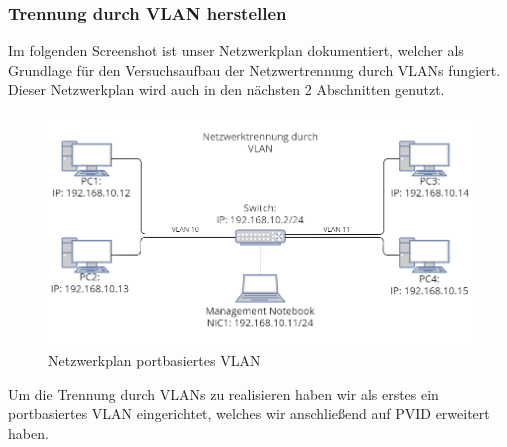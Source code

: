         \subsubsection{Trennung durch VLAN herstellen}
        Im folgenden Screenshot ist unser Netzwerkplan dokumentiert, welcher als Grundlage für
        den Versuchsaufbau der Netzwertrennung durch VLANs fungiert. Dieser Netzwerkplan wird auch
        in den nächsten 2 Abschnitten genutzt.
        \begin{figure}[H]
            \centering
            \includegraphics[width=\linewidth]{images/Trennung durch VLAN herstellen/Netzwerkplan_VLAN._portbasiert.png}
            \caption{Netzwerkplan portbasiertes VLAN}
        \end{figure}
        Um die Trennung durch VLANs zu realisieren haben wir als erstes ein portbasiertes VLAN eingerichtet, welches wir
        anschließend auf PVID erweitert haben.
